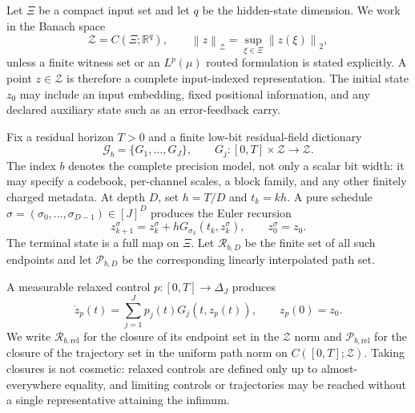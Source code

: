 \documentclass[twoside,11pt]{article}
\newcommand{\R}{\mathbb{R}}
\newcommand{\Z}{\mathcal{Z}}
\newcommand{\Rel}{\mathrm{rel}}
\newcommand{\norm}[1]{\left\lVert #1\right\rVert}
\newcommand{\RR}{\mathscr{R}}
\begin{document}
Let $\Xi$ be a compact input set and let $q$ be the hidden-state dimension.  We work in the Banach space
\begin{equation}
 \Z=C(\Xi;\R^q),
 \qquad
 \norm{z}_{\Z}=\sup_{\xi\in\Xi}\norm{z(\xi)}_2,
 \label{eq:lifted-space}
\end{equation}
unless a finite witness set or an $L^p(\mu)$ routed formulation is stated explicitly.  A point $z\in\Z$ is therefore a complete input-indexed representation.  The initial state $z_0$ may include an input embedding, fixed positional information, and any declared auxiliary state such as an error-feedback carry.

Fix a residual horizon $T>0$ and a finite low-bit residual-field dictionary
\begin{equation}
 \mathcal G_b=\{G_1,\ldots,G_J\},
 \qquad G_j:[0,T]\times\Z\to\Z.
 \label{eq:field-dictionary}
\end{equation}
The index $b$ denotes the complete precision model, not only a scalar bit width: it may specify a codebook, per-channel scales, a block family, and any other finitely charged metadata.  At depth $D$, set $h=T/D$ and $t_k=kh$.  A pure schedule $\sigma=(\sigma_0,\ldots,\sigma_{D-1})\in[J]^D$ produces the Euler recursion
\begin{equation}
 z_{k+1}^{\sigma}
 =z_k^{\sigma}+hG_{\sigma_k}(t_k,z_k^{\sigma}),
 \qquad z_0^{\sigma}=z_0.
 \label{eq:pure-euler-main}
\end{equation}
The terminal state is a full map on $\Xi$.  Let $\RR_{b,D}$ be the finite set of all such endpoints and let $\mathscr P_{b,D}$ be the corresponding linearly interpolated path set.

A measurable relaxed control $p:[0,T]\to\Delta_J$ produces
\begin{equation}
 \dot z_p(t)=\sum_{j=1}^Jp_j(t)G_j(t,z_p(t)),
 \qquad z_p(0)=z_0.
 \label{eq:relaxed-ode-main}
\end{equation}
We write $\RR_{b,\Rel}$ for the closure of its endpoint set in the $\Z$ norm and $\mathscr P_{b,\Rel}$ for the closure of the trajectory set in the uniform path norm on $C([0,T];\Z)$.  Taking closures is not cosmetic: relaxed controls are defined only up to almost-everywhere equality, and limiting controls or trajectories may be reached without a single representative attaining the infimum.
\end{document}
